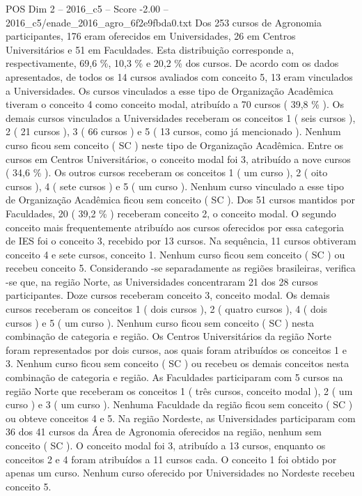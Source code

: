 \begin{textsample}{POS Dim 2 – 2016\_c5 – Score -2.00 – 2016\_c5/enade\_2016\_agro\_6f2e9fbda0.txt}
Dos 253 cursos de Agronomia participantes, 176 eram oferecidos em Universidades, 26 em Centros Universitários e 51 em Faculdades.
Esta distribuição corresponde a, respectivamente, 69,6 \%, 10,3 \% e 20,2 \% dos cursos.
De acordo com os dados apresentados, de todos os 14 cursos avaliados com conceito 5, 13 eram vinculados a Universidades.
Os cursos vinculados a esse tipo de Organização Acadêmica tiveram o conceito 4 como conceito modal, atribuído a 70 cursos ( 39,8 \% ).
Os demais cursos vinculados a Universidades receberam os conceitos 1 ( seis cursos ), 2 ( 21 cursos ), 3 ( 66 cursos ) e 5 ( 13 cursos, como já mencionado ).
Nenhum curso ficou sem conceito ( SC ) neste tipo de Organização Acadêmica.
Entre os cursos em Centros Universitários, o conceito modal foi 3, atribuído a nove cursos ( 34,6 \% ).
Os outros cursos receberam os conceitos 1 ( um curso ), 2 ( oito cursos ), 4 ( sete cursos ) e 5 ( um curso ).
Nenhum curso vinculado a esse tipo de Organização Acadêmica ficou sem conceito ( SC ).
Dos 51 cursos mantidos por Faculdades, 20 ( 39,2 \% ) receberam conceito 2, o conceito modal.
O segundo conceito mais frequentemente atribuído aos cursos oferecidos por essa categoria de IES foi o conceito 3, recebido por 13 cursos.
Na sequência, 11 cursos obtiveram conceito 4 e sete cursos, conceito 1.
Nenhum curso ficou sem conceito ( SC ) ou recebeu conceito 5.
Considerando -se separadamente as regiões brasileiras, verifica -se que, na região Norte, as Universidades concentraram 21 dos 28 cursos participantes.
Doze cursos receberam conceito 3, conceito modal.
Os demais cursos receberam os conceitos 1 ( dois cursos ), 2 ( quatro cursos ), 4 ( dois cursos ) e 5 ( um curso ).
Nenhum curso ficou sem conceito ( SC ) nesta combinação de categoria e região.
Os Centros Universitários da região Norte foram representados por dois cursos, aos quais foram atribuídos os conceitos 1 e 3.
Nenhum curso ficou sem conceito ( SC ) ou recebeu os demais conceitos nesta combinação de categoria e região.
As Faculdades participaram com 5 cursos na região Norte que receberam os conceitos 1 ( três cursos, conceito modal ), 2 ( um curso ) e 3 ( um curso ).
Nenhuma Faculdade da região ficou sem conceito ( SC ) ou obteve conceitos 4 e 5.
Na região Nordeste, as Universidades participaram com 36 dos 41 cursos da Área de Agronomia oferecidos na região, nenhum sem conceito ( SC ).
O conceito modal foi 3, atribuído a 13 cursos, enquanto os conceitos 2 e 4 foram atribuídos a 11 cursos cada.
O conceito 1 foi obtido por apenas um curso.
Nenhum curso oferecido por Universidades no Nordeste recebeu conceito 5.

\end{textsample}
